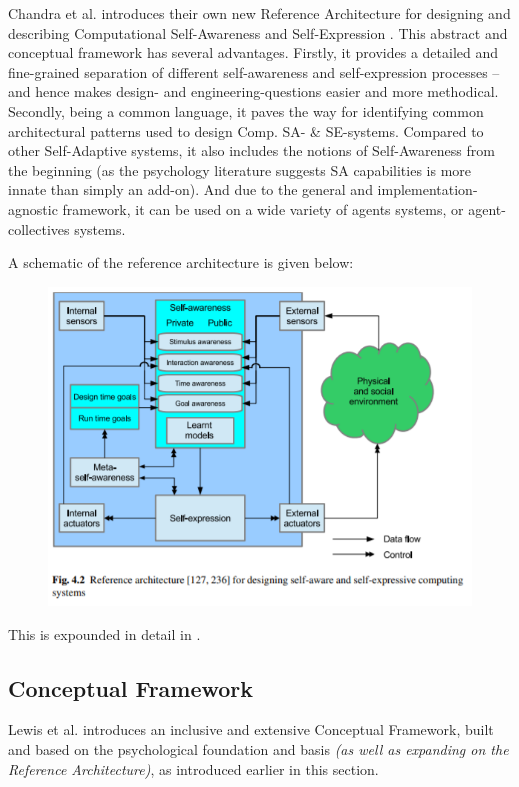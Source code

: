 \documentclass{article}
\begin{document}
Chandra et al. introduces their own new Reference Architecture for designing and describing Computational Self-Awareness and Self-Expression \cite{sacs16_ch4}. This abstract and conceptual framework has several advantages. Firstly, it provides a detailed and fine-grained separation of different self-awareness and self-expression processes -- and hence makes design- and engineering-questions easier and more methodical. Secondly, being a common language, it paves the way for identifying common architectural patterns used to design Comp. SA- \& SE-systems. Compared to other Self-Adaptive systems, it also includes the notions of Self-Awareness from the beginning (as the psychology literature suggests SA capabilities is more innate than simply an add-on). And due to the general and implementation-agnostic framework, it can be used on a wide variety of agents systems, or agent-collectives systems.

A schematic of the reference architecture is given below:

\begin{figure}[!htp]
\centering
\includegraphics[width=0.9\columnwidth]{Assets/pics/arkitektur.PNG}
\end{figure}

This is expounded in detail in \cite{sacs16_ch4}.

\subsection{Conceptual Framework}

Lewis et al. \cite{sacs17_ch3} introduces an inclusive and extensive Conceptual Framework, built and based on the psychological foundation and basis \textit{(as well as expanding on the Reference Architecture)}, as introduced earlier in this section.
\end{document}
